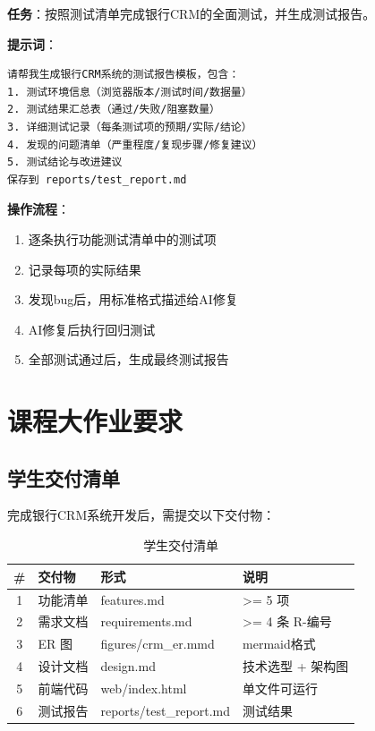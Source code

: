 \begin{practicebox}[完整测试流程]
\textbf{任务}：按照测试清单完成银行CRM的全面测试，并生成测试报告。

\textbf{提示词}：

\begin{lstlisting}
请帮我生成银行CRM系统的测试报告模板，包含：
1. 测试环境信息（浏览器版本/测试时间/数据量）
2. 测试结果汇总表（通过/失败/阻塞数量）
3. 详细测试记录（每条测试项的预期/实际/结论）
4. 发现的问题清单（严重程度/复现步骤/修复建议）
5. 测试结论与改进建议
保存到 reports/test_report.md
\end{lstlisting}

\textbf{操作流程}：
\begin{enumerate}[leftmargin=2em]
  \item 逐条执行功能测试清单中的测试项
  \item 记录每项的实际结果
  \item 发现bug后，用标准格式描述给AI修复
  \item AI修复后执行回归测试
  \item 全部测试通过后，生成最终测试报告
\end{enumerate}
\end{practicebox}

\section{课程大作业要求}

\subsection{学生交付清单}

完成银行CRM系统开发后，需提交以下交付物：

\begin{table}[H]
\centering
\begin{tabular}{clll}
\toprule
\textbf{\#} & \textbf{交付物} & \textbf{形式} & \textbf{说明} \\
\midrule
1 & 功能清单 & features.md & >= 5 项 \\
2 & 需求文档 & requirements.md & >= 4 条 R-编号 \\
3 & ER 图 & figures/crm\_er.mmd & mermaid格式 \\
4 & 设计文档 & design.md & 技术选型 + 架构图 \\
5 & 前端代码 & web/index.html & 单文件可运行 \\
6 & 测试报告 & reports/test\_report.md & 测试结果 \\
\bottomrule
\end{tabular}
\caption{学生交付清单}
\end{table}

